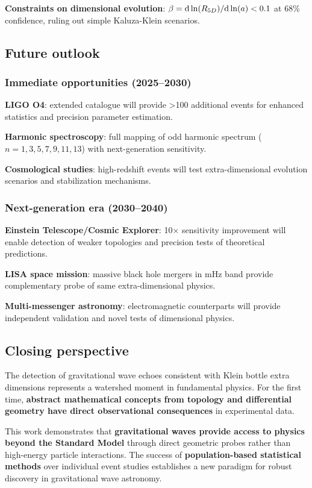 \documentclass[12pt]{iopart}
\begin{document}
\textbf{Constraints on dimensional evolution}: $\beta = {\rm d} \ln(R_{5D})/{\rm d} \ln(a) < 0.1$ at 68\% confidence, ruling out simple Kaluza-Klein scenarios.

\subsection{Future outlook}

\subsubsection{Immediate opportunities (2025--2030)}

\textbf{LIGO O4}: extended catalogue will provide >100 additional events for enhanced statistics and precision parameter estimation.

\textbf{Harmonic spectroscopy}: full mapping of odd harmonic spectrum ($n=1,3,5,7,9,11,13$) with next-generation sensitivity.

\textbf{Cosmological studies}: high-redshift events will test extra-dimensional evolution scenarios and stabilization mechanisms.

\subsubsection{Next-generation era (2030--2040)}

\textbf{Einstein Telescope/Cosmic Explorer}: 10$\times$ sensitivity improvement will enable detection of weaker topologies and precision tests of theoretical predictions.

\textbf{LISA space mission}: massive black hole mergers in mHz band provide complementary probe of same extra-dimensional physics.

\textbf{Multi-messenger astronomy}: electromagnetic counterparts will provide independent validation and novel tests of dimensional physics.

\subsection{Closing perspective}

The detection of gravitational wave echoes consistent with Klein bottle extra dimensions represents a watershed moment in fundamental physics. For the first time, \textbf{abstract mathematical concepts from topology and differential geometry have direct observational consequences} in experimental data.

This work demonstrates that \textbf{gravitational waves provide access to physics beyond the Standard Model} through direct geometric probes rather than high-energy particle interactions. The success of \textbf{population-based statistical methods} over individual event studies establishes a new paradigm for robust discovery in gravitational wave astronomy.
\end{document}
